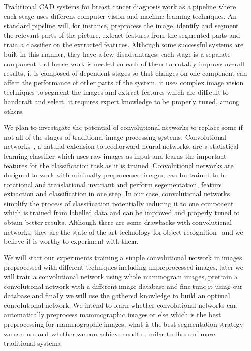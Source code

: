 Traditional CAD systems for breast cancer diagnosis work as a pipeline where each stage uses different computer vision and machine learning techniques. An standard pipeline will, for instance, preprocess the image, identify and segment the relevant parts of the picture, extract features from the segmented parts and train a classifier on the extracted features. Although some successful systems are built in this manner, they have a few disadvantages: each stage is a separate component and hence work is needed on each of them to notably improve overall results, it is composed of dependent stages so that changes on one component can affect the performance of other parts of the system, it uses complex image vision techniques to segment the images and extract features which are difficult to handcraft and select, it requires expert knowledge to be properly tuned, among others.

We plan to investigate the potential of convolutional networks to replace some if not all of the stages of traditional image processing systems. Convolutional networks~\cite{Fukushima1980,LeCun1998}, a natural extension to feedforward neural networks, are a statistical learning classifier which uses raw images as input and learns the important features for the classification task as it is trained. Convolutional networks are designed to work with minimally preprocessed images, can be trained to be rotational and translational invariant and perform segementation, feature extraction and classification in one step. In our case, convolutional networks simplify the process of classification potentially reducing it to one component which is trained from labelled data and can be improved and properly tuned to obtain better results. Although there are some drawbacks with convolutional networks, they are the state-of-the-art technology for object recognition~\cite{Russakovsky2014} and we believe it is worthy to experiment with them.


We will start our experiments training a simple convolutional network in images preprocessed with different techniques including unpreprocessed images, later we will train a convolutional network using whole mammogram images, pretrain a convolutional network with a different image database and fine-tune it using our database and finally we will use the gathered knowledge to build an optimal convolutional network. We intend to learn whether convolutional networks can automatically preprocess mammographic images or else which is the best preprocessing for mammographic images, what is the best segmentation strategy we can use and whether we can achieve results similar to those of more traditional systems.

